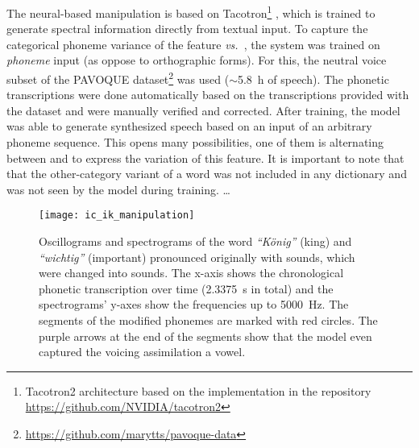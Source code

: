 





The neural-based manipulation is based on Tacotron\footnote{Tacotron2 architecture based on the implementation in the repository \url{https://github.com/NVIDIA/tacotron2}} \citep{Shen2018natural}, which is trained to generate spectral information directly from textual input.
To capture the categorical phoneme variance of the feature \emph{\textipa{[\c{c}]} vs.\ \textipa{[k]}}, the system was trained on \emph{phoneme} input (as oppose to orthographic forms).
For this, the neutral voice subset of the PAVOQUE dataset\footnote{\url{https://github.com/marytts/pavoque-data}} \citep{Steiner2013pavoque} was used ($\sim$\SI{5.8}{\hour} of speech).
The phonetic transcriptions were done automatically based on the transcriptions provided with the dataset and were manually verified and corrected.
After training, the model was able to generate synthesized speech based on an input of an arbitrary phoneme sequence.
This opens many possibilities, one of them is alternating between \textipa{[\c{c}]} and \textipa{[k]} to express the variation of this feature.
It is important to note that that the other-category variant of a word was not included in any dictionary and was not seen by the model during training.
\ldots
%
\begin{landscape}
	\begin{figure}[t]
		\centering
		\hspace*{-2cm}
		\texttt{[image: ic\_ik\_manipulation]}
		\caption[Oscillograms and spectrograms of categorical manipulation comparison]
			{Oscillograms and spectrograms of the word \emph{\enquote{König}} (king) and \emph{\enquote{wichtig}} (important) pronounced originally with \textipa{[\c{c}]} sounds, which were changed into \textipa{[k]} sounds.
			The x-axis shows the chronological phonetic transcription over time (\SI{2.3375}{\second} in total) and the spectrograms' y-axes show the frequencies up to \SI{5000}{\hertz}.
			The segments of the modified phonemes are marked with red circles.
			The purple arrows at the end of the \textipa{[k]} segments show that the model even captured the voicing assimilation a vowel.}
		\label{fig:spectrogram_ic_ik}
	\end{figure}
\end{landscape}